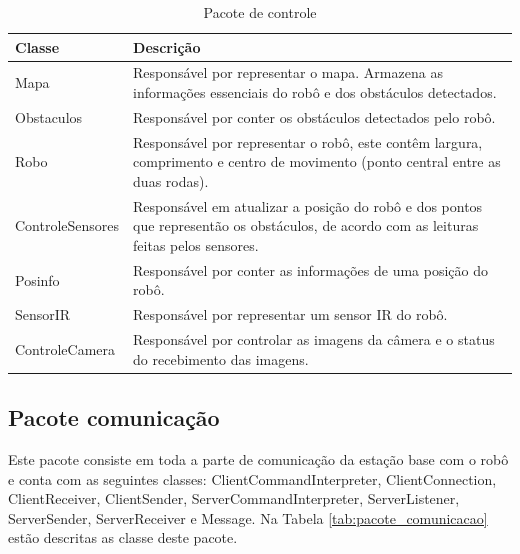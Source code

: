 \begin{table}[h]
  \centering
  \caption{Pacote de controle}
    \begin{tabular}{p{6cm}p{8cm}}
    \toprule
    \textbf{Classe} & \textbf{Descrição} \\ \hline
    \midrule
    Mapa  & Responsável por representar o mapa. Armazena as informações essenciais do robô e dos obstáculos detectados. \\ \hline
    Obstaculos & Responsável por conter os obstáculos detectados pelo robô. \\ \hline
    Robo  & Responsável por representar o robô, este contêm largura, comprimento e centro de movimento (ponto central entre as duas rodas). \\ \hline
    ControleSensores & Responsável em atualizar a posição do robô e dos pontos que representão os obstáculos, de acordo com as leituras feitas pelos sensores. \\ \hline
    Posinfo & Responsável por conter as informações de uma posição do robô. \\ \hline
    SensorIR & Responsável por representar um sensor IR do robô. \\ \hline
    ControleCamera & Responsável por controlar as imagens da câmera e o status do recebimento das imagens. \\ \hline
    \bottomrule
    \end{tabular}%
  \label{tab:pacote_controle}%
\end{table}%

\subsection{Pacote comunicação}

Este pacote consiste em toda a parte de comunicação da estação base com o robô e conta com as seguintes classes: ClientCommandInterpreter, ClientConnection, ClientReceiver, ClientSender, ServerCommandInterpreter, ServerListener, ServerSender, ServerReceiver e Message. Na Tabela \ref{tab:pacote_comunicacao} estão descritas as classe deste pacote.

